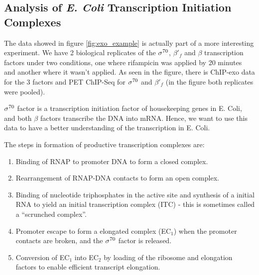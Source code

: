 \documentclass[11pt]{article}\usepackage[]{graphicx}\usepackage[]{color}
\begin{document}
\subsection{Analysis of \emph{E. Coli} Transcription Initiation Complexes}
\label{sec:ecoli}

The data showed in figure \ref{fig:exo_example} is actually part of a
more interesting experiment. We have 2 biological replicates of the
$\sigma^{70}$, $\beta'_f$ and $\beta$ transcription factors under two
conditions, one where rifampicin was applied by 20 minutes and another
where it wasn't applied. As seen in the figure, there is ChIP-exo data
for the 3 factors and PET ChIP-Seq for $\sigma^{70}$ and $\beta'_f$ (in the
figure both replicates were pooled).

$\sigma^{70}$ factor is a transcription initiation factor of housekeeping
genes in E. Coli, and both $\beta$ factors transcribe the DNA into
mRNA. Hence, we want to use this data to have a better understanding
of the transcription in E. Coli.

The steps in formation of productive transcription complexes are:

\begin{enumerate}
\item Binding of RNAP to promoter DNA to form a closed complex.
\item Rearrangement of RNAP-DNA contacts to form an open complex.
\item Binding of nucleotide triphosphates in the active site and
  synthesis of a initial RNA to yield an initial transcription complex
  (ITC) - this is sometimes called a ``scrunched complex''.
\item Promoter escape to form a elongated complex (EC$_1$) when the
  promoter contacts are broken, and the $\sigma^{70}$ factor is released.
\item Conversion of EC$_1$ into EC$_2$ by loading of the ribosome and
  elongation factors to enable efficient transcript elongation.
\end{enumerate}

\end{document}
